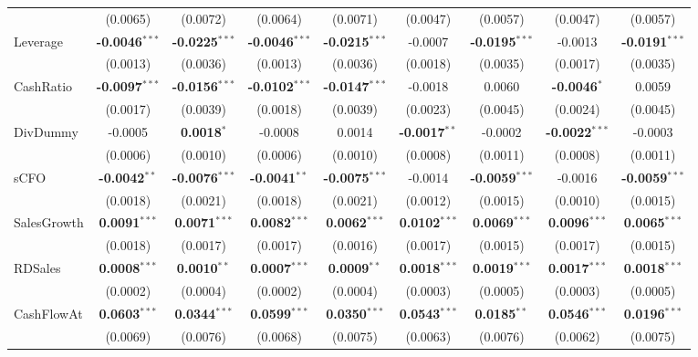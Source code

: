 \begin{landscape}
\begin{table}[H]
\begin{tabular}{lcccccccc}
 & (0.0065) & (0.0072) & (0.0064) & (0.0071) & (0.0047) & (0.0057) & (0.0047) & (0.0057) \\
Leverage & \textbf{-0.0046}$^{***}$ & \textbf{-0.0225}$^{***}$ & \textbf{-0.0046}$^{***}$ & \textbf{-0.0215}$^{***}$ & -0.0007 & \textbf{-0.0195}$^{***}$ & -0.0013 & \textbf{-0.0191}$^{***}$ \\
 & (0.0013) & (0.0036) & (0.0013) & (0.0036) & (0.0018) & (0.0035) & (0.0017) & (0.0035) \\
CashRatio & \textbf{-0.0097}$^{***}$ & \textbf{-0.0156}$^{***}$ & \textbf{-0.0102}$^{***}$ & \textbf{-0.0147}$^{***}$ & -0.0018 & 0.0060 & \textbf{-0.0046}$^{*}$ & 0.0059 \\
 & (0.0017) & (0.0039) & (0.0018) & (0.0039) & (0.0023) & (0.0045) & (0.0024) & (0.0045) \\
DivDummy & -0.0005 & \textbf{0.0018}$^{*}$ & -0.0008 & 0.0014 & \textbf{-0.0017}$^{**}$ & -0.0002 & \textbf{-0.0022}$^{***}$ & -0.0003 \\
 & (0.0006) & (0.0010) & (0.0006) & (0.0010) & (0.0008) & (0.0011) & (0.0008) & (0.0011) \\
sCFO & \textbf{-0.0042}$^{**}$ & \textbf{-0.0076}$^{***}$ & \textbf{-0.0041}$^{**}$ & \textbf{-0.0075}$^{***}$ & -0.0014 & \textbf{-0.0059}$^{***}$ & -0.0016 & \textbf{-0.0059}$^{***}$ \\
 & (0.0018) & (0.0021) & (0.0018) & (0.0021) & (0.0012) & (0.0015) & (0.0010) & (0.0015) \\
SalesGrowth & \textbf{0.0091}$^{***}$ & \textbf{0.0071}$^{***}$ & \textbf{0.0082}$^{***}$ & \textbf{0.0062}$^{***}$ & \textbf{0.0102}$^{***}$ & \textbf{0.0069}$^{***}$ & \textbf{0.0096}$^{***}$ & \textbf{0.0065}$^{***}$ \\
 & (0.0018) & (0.0017) & (0.0017) & (0.0016) & (0.0017) & (0.0015) & (0.0017) & (0.0015) \\
RDSales & \textbf{0.0008}$^{***}$ & \textbf{0.0010}$^{**}$ & \textbf{0.0007}$^{***}$ & \textbf{0.0009}$^{**}$ & \textbf{0.0018}$^{***}$ & \textbf{0.0019}$^{***}$ & \textbf{0.0017}$^{***}$ & \textbf{0.0018}$^{***}$ \\
 & (0.0002) & (0.0004) & (0.0002) & (0.0004) & (0.0003) & (0.0005) & (0.0003) & (0.0005) \\
CashFlowAt & \textbf{0.0603}$^{***}$ & \textbf{0.0344}$^{***}$ & \textbf{0.0599}$^{***}$ & \textbf{0.0350}$^{***}$ & \textbf{0.0543}$^{***}$ & \textbf{0.0185}$^{**}$ & \textbf{0.0546}$^{***}$ & \textbf{0.0196}$^{***}$ \\
 & (0.0069) & (0.0076) & (0.0068) & (0.0075) & (0.0063) & (0.0076) & (0.0062) & (0.0075) \\

\end{tabular}
\end{table}
\end{landscape}
